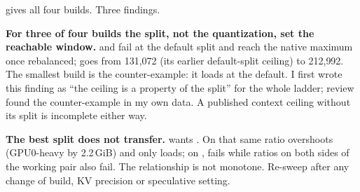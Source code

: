 \begin{table}[t]
\centering\small
\caption{Context ceilings, first battery: MTP $n{=}2$,  KV, layer split, ,
official non-thinking sampling, 192-token generation after a $\geq$94.7\,\% prefill. Failures at
262{,}144 are single attempts except where noted; all are compute-buffer out-of-memory errors read from
the saved server log.}\label{tab:ceilings}
\end{table}

 gives all four builds. Three findings.

\textbf{For three of four builds the split, not the quantization, set the reachable window.} \Qfive{}
and \Qsix{} fail at the default split and reach the native maximum once rebalanced; \QsixXL{} goes from
131{,}072 (its earlier default-split ceiling) to 212{,}992. The smallest build is the counter-example:
it loads at the default. I first wrote this finding as ``the ceiling is a property of the split'' for
the whole ladder; review found the counter-example in my own data. A published context ceiling without
its split is incomplete either way.

\textbf{The best split does not transfer.} \Qsix{} wants . On \QsixXL{} that same ratio
overshoots (GPU0-heavy by 2.2\,GiB) and only  loads; on \Qsix,  fails while
ratios on both sides of the working pair also fail. The relationship is not monotone. Re-sweep after
any change of build, KV precision or speculative setting.

